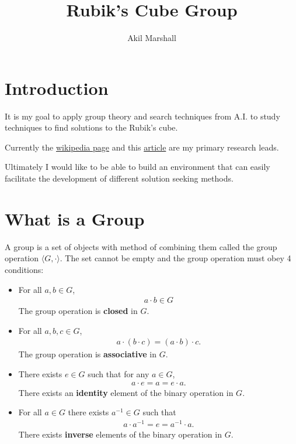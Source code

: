 \documentclass{article}
\title{Rubik's Cube Group}
\author{Akil Marshall}
\begin{document}
\maketitle
\section{Introduction}
It is my goal to apply group theory and search techniques from A.I. to study techniques to find solutions to the Rubik's cube.

Currently the \href{https://en.wikipedia.org/wiki/Rubik\%27s\_Cube\_group}{wikipedia page} and this \href{https://www.quora.com/Group-Theory-mathematics/Why-are-commutators-useful-for-solving-permutation-puzzles/answer/Mark-Eichenlaub}{article} are my primary research leads.

Ultimately I would like to be able to build an environment that can easily facilitate the development of different solution seeking methods.
\section{What is a Group}
A group is a set of objects with method of combining them called the group operation $\langle G,\cdot\rangle$. The set cannot be empty and the group operation must obey 4 conditions:
\begin{itemize}
    \item For all $a,b\in G$,
        \begin{align*}
            a\cdot b\in G
        \end{align*}
        The group operation is \textbf{closed} in $G$.
    \item For all $a,b,c\in G$,
        \begin{align*}
            a\cdot(b\cdot c)=(a\cdot b)\cdot c.
        \end{align*}
        The group operation is \textbf{associative} in $G$.
    \item There exists $e\in G$ such that for any $a\in G$,
        \begin{align*}
            a\cdot e=a=e\cdot a.
        \end{align*}
        There exists an \textbf{identity} element of the binary operation in $G$.
    \item For all $a\in G$ there exists  $a^{-1}\in G$ such that
        \begin{align*}
            a\cdot a^{-1}=e=a^{-1}\cdot a.
        \end{align*}
        There exists \textbf{inverse} elements of the binary operation in $G$.
\end{itemize}
\end{document}
